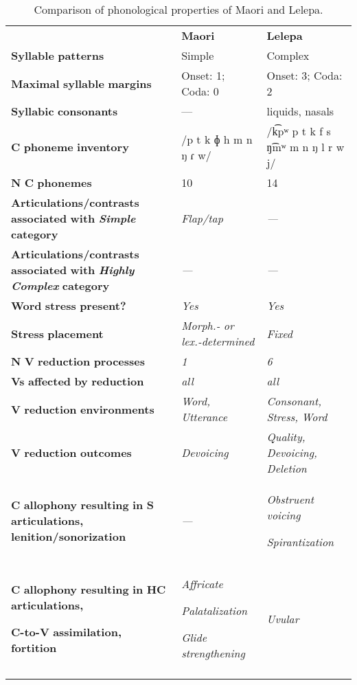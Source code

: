 \begin{table}
\begin{tabularx}{\textwidth}{XXX}
\lsptoprule
 & \textbf{Maori} & \textbf{Lelepa}\\
 \textbf{Syllable} \textbf{patterns} & Simple & Complex\\
 \textbf{Maximal} \textbf{syllable} \textbf{margins} & Onset: 1; Coda: 0 & Onset: 3; Coda: 2\\
 \textbf{Syllabic} \textbf{consonants} & — & liquids, nasals\\
 \textbf{C} \textbf{phoneme} \textbf{inventory} & /p t k ɸ h m n ŋ ɾ w/ & /k͡pʷ p t k f s ŋ͡mʷ m n ŋ l r w j/\\
 \textbf{N} \textbf{C} \textbf{phonemes} & 10 & 14\\
 \textbf{Articulations/contrasts} \textbf{associated} \textbf{with} \textbf{\textit{Simple}} \textbf{category} & \textit{Flap/tap} & \textit{—}\\
 \textbf{Articulations/contrasts} \textbf{associated} \textbf{with} \textbf{\textit{Highly} \textit{Complex}} \textbf{category} & \textit{—} & \textit{—}\\
 \textbf{Word} \textbf{stress} \textbf{present?} & \textit{Yes} & \textit{Yes}\\
 \textbf{Stress} \textbf{placement} & \textit{Morph.-} \textit{or} \textit{lex.-determined} & \textit{Fixed}\\
 \textbf{N} \textbf{V} \textbf{reduction} \textbf{processes} & \textit{1} & \textit{6}\\
 \textbf{Vs} \textbf{affected} \textbf{by} \textbf{reduction}  & \textit{all} & \textit{all}\\
 \textbf{V} \textbf{reduction} \textbf{environments} & \textit{Word,} \textit{Utterance} & \textit{Consonant,} \textit{Stress,} \textit{Word}\\
 \textbf{V} \textbf{reduction} \textbf{outcomes} & \textit{Devoicing} & \textit{Quality,} \textit{Devoicing,} \textit{Deletion}\\
 \textbf{C} \textbf{allophony} \textbf{resulting} \textbf{in} \textbf{S} \textbf{articulations,} \textbf{lenition/sonorization} & \textit{—} & { \textit{Obstruent} \textit{voicing}}

 \textit{Spirantization}\\
{ \textbf{C} \textbf{allophony} \textbf{resulting} \textbf{in} \textbf{HC} \textbf{articulations,} }

 \textbf{C-to-V} \textbf{assimilation,} \textbf{fortition} & { \textit{Affricate}}

{ \textit{Palatalization}}

 \textit{Glide} \textit{strengthening} & \textit{Uvular}\\
\lspbottomrule
\end{tabularx}
\caption{\label{8.7}Comparison of phonological properties of Maori and Lelepa.}
\end{table}

